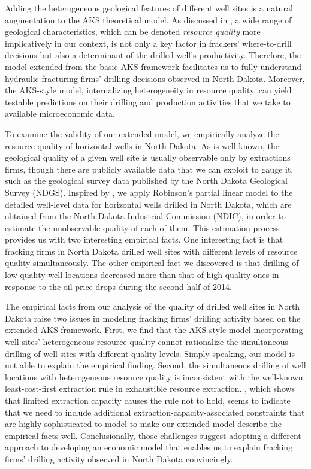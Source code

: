 Adding the heterogeneous geological features of different well sites is a natural augmentation to the AKS theoretical model. As discussed in \cite{Learning-where-to-drill_Agerton_2020}, a wide range of geological characteristics, which can be denoted \textit{resource quality} more implicatively in our context, is not only a key factor in frackers' where-to-drill decisions but also a determinant of the drilled well's productivity. Therefore, the model extended from the basic AKS framework facilitates us to fully understand hydraulic fracturing firms' drilling decisions observed in North Dakota. Moreover, the AKS-style model, internalizing heterogeneity in resource quality, can yield testable predictions on their drilling and production activities that we take to available microeconomic data. 

To examine the validity of our extended model, we empirically analyze the resource quality of horizontal wells in North Dakota. As is well known, the geological quality of a given well site is usually observable only by extractions firms, though there are publicly available data that we can exploit to gauge it, such as the geological survey data published by the North Dakota Geological Survey (NDGS). Inspired by \cite{The-Economics-of-Time-Limited-Development-Options_2020_Herrnstadt-Kellogg-and-Lewis}, we apply Robinson's partial linear model to the detailed well-level data for horizontal wells drilled in North Dakota, which are obtained from the North Dakota Industrial Commission (NDIC), in order to estimate the unobservable quality of each of them. This estimation process provides us with two interesting empirical facts. One interesting fact is that fracking firms in North Dakota drilled well sites with different levels of resource quality simultaneously. The other empirical fact we discovered is that drilling of low-quality well locations decreased more than that of high-quality ones in response to the oil price drops during the second half of 2014. 

The empirical facts from our analysis of the quality of drilled well sites in North Dakota raise two issues in modeling fracking firms' drilling activity based on the extended AKS framework. First, we find that the AKS-style model incorporating well sites' heterogeneous resource quality cannot rationalize the simultaneous drilling of well sites with different quality levels. Simply speaking, our model is not able to explain the empirical finding. Second, the simultaneous drilling of well locations with heterogeneous resource quality is inconsistent with the well-known least-cost-first extraction rule in exhaustible resource extraction. \cite{Extraction-Capacity-and-the-Optimal-Order-of-Extraction_Holland_2003}, which shows that limited extraction capacity causes the rule not to hold, seems to indicate that we need to include additional extraction-capacity-associated constraints that are highly sophisticated to model to make our extended model describe the empirical facts well. Conclusionally, those challenges suggest adopting a different approach to developing an economic model that enables us to explain fracking firms' drilling activity observed in North Dakota convincingly. 

